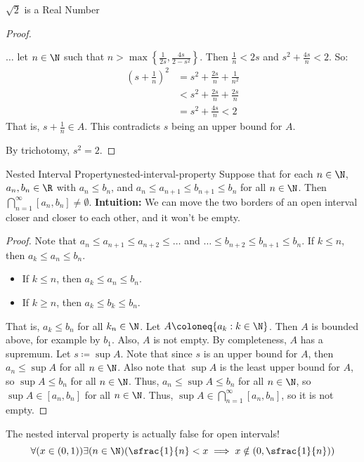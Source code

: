 \begin{thmbox}{$\sqrt{2}$ is a Real Number}{}
\begin{proof}
\begin{enumerate}
\begin{notebox}
            \end{notebox}
            $\ldots$ let $n \in \N$ such that $n > \max\left\{ \frac{1}{2s}, \frac{4s}{2-s^2} \right\}$. Then $\frac{1}{n} < 2s$ and $s^2 + \frac{4s}{n} < 2$. So:
            \begin{align*}
                \left( s + \frac{1}{n} \right)^2
                &= s^2 + \frac{2s}{n} + \frac{1}{n^2} \\
                &< s^2 + \frac{2s}{n} + \frac{2s}{n} \\
                &= s^2 + \frac{4s}{n} < 2
            \end{align*}
            That is, $s + \frac{1}{n} \in A$. This contradicts $s$ being an upper bound for $A$.
        \end{enumerate}
        By trichotomy, $s^2 = 2$.
    \end{proof}
\end{thmbox}

\begin{thmbox}{Nested Interval Property}{nested-interval-property}
    Suppose that for each $n \in \N$, $a_n, b_n \in \R$ with $a_n \leq b_n$, and $a_n \leq a_{n+1} \leq b_{n+1} \leq b_n$ for all $n \in \N$. Then $\bigcap_{n=1}^\infty [ a_n, b_n ] \neq \emptyset$.
    \tcblower
    \textbf{Intuition:} We can move the two borders of an open interval closer and closer to each other, and it won't be empty.
    \begin{proof}
        Note that $a_n \leq a_{n+1} \leq a_{n+2} \leq \ldots$ and $\ldots \leq b_{n+2} \leq b_{n+1} \leq b_n$. If $k \leq n$, then $a_k \leq a_n \leq b_n$.
        \begin{itemize}[noitemsep]
            \item If $k \leq n$, then $a_k \leq a_n \leq b_n$.
            \item If $k \geq n$, then $a_k \leq b_k \leq b_n$.
        \end{itemize}
        That is, $a_k \leq b_n$ for all $k_n \in \N$. Let $A \coloneq \{ a_k : k \in \N\}$. Then $A$ is bounded above, for example by $b_1$. Also, $A$ is not empty. By completeness, $A$ has a supremum. Let $s \coloneq \sup A$. Note that since $s$ is an upper bound for $A$, then $a_n \leq \sup A$ for all $n \in \N$. Also note that $\sup A$ is the least upper bound for $A$, so $\sup A \leq b_n$ for all $n \in \N$. Thus, $a_n \leq \sup A \leq b_n$ for all $n \in \N$, so $\sup A \in [ a_n, b_n ]$ for all $n \in \N$. Thus, $\sup A \in \bigcap_{n=1}^\infty [ a_n, b_n ]$, so it is not empty.
    \end{proof}
\end{thmbox}

The nested interval property is actually false for open intervals!
\[ \forall (x \in (0,1)) \exists (n \in \N) (\sfrac{1}{n} < x \implies x \notin (0, \sfrac{1}{n}) ) \]
